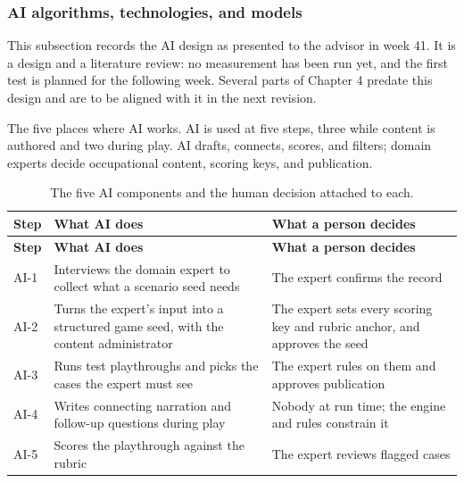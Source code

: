 \subsubsection{AI algorithms, technologies, and models}

This subsection records the AI design as presented to the advisor in week 41. It is a design and a literature review: no measurement has been run yet, and the first test is planned for the following week. Several parts of Chapter 4 predate this design and are to be aligned with it in the next revision.

The five places where AI works. AI is used at five steps, three while content is authored and two during play. AI drafts, connects, scores, and filters; domain experts decide occupational content, scoring keys, and publication.

{\small
\begin{longtable}{|>{\raggedright\arraybackslash}p{}|>{\raggedright\arraybackslash}p{}|>{\raggedright\arraybackslash}p{}|}
\caption{The five AI components and the human decision attached to each.} \\
\hline
\textbf{Step} & \textbf{What AI does} & \textbf{What a person decides} \\ \hline
\endfirsthead
\hline
\textbf{Step} & \textbf{What AI does} & \textbf{What a person decides} \\ \hline
\endhead
AI-1 & Interviews the domain expert to collect what a scenario seed needs & The expert confirms the record \\ \hline
AI-2 & Turns the expert's input into a structured game seed, with the content administrator & The expert sets every scoring key and rubric anchor, and approves the seed \\ \hline
AI-3 & Runs test playthroughs and picks the cases the expert must see & The expert rules on them and approves publication \\ \hline
AI-4 & Writes connecting narration and follow-up questions during play & Nobody at run time; the engine and rules constrain it \\ \hline
AI-5 & Scores the playthrough against the rubric & The expert reviews flagged cases \\ \hline
\end{longtable}
}

